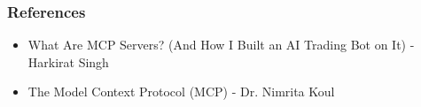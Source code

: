 \begin{frame}[fragile]\frametitle{References}
    \begin{itemize}
        \item What Are MCP Servers? (And How I Built an AI Trading Bot on It) - Harkirat Singh
		\item The Model Context Protocol (MCP) - Dr. Nimrita Koul


    \end{itemize}
\end{frame}



